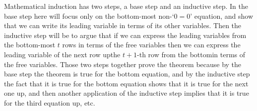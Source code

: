 Mathematical induction has two steps, a base step and
an inductive step.
In the base step here will focus only on the
bottom-most non-`\( 0=0 \)' equation, and show that we can  
write its leading variable in terms of its other variables.
Then the inductive step will be to
argue that if we can express the leading variables from the
bottom-most \( t \) rows in terms of the free variables then
we can express the leading variable of the next row up\Dash the \( t+1 \)-th
row from the bottom\Dash in terms of the free variables.
Those two steps together prove the theorem 
because by the base step the theorem is true for the bottom equation, 
and by the inductive step the fact that it is true for the bottom
equation shows that 
it is true for the next one up, and then another application of
the inductive step implies that it is true for the third equation up,
etc.

